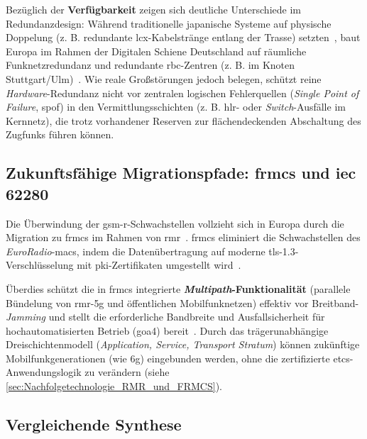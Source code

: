 \documentclass[runningheads]{res/llncs}
\begin{document}
Bezüglich der \textbf{Verfügbarkeit} zeigen sich deutliche Unterschiede im Redundanzdesign: Während traditionelle japanische Systeme auf physische Doppelung (z. B. redundante \gls{lcx}-Kabelstränge entlang der Trasse) setzten~\parencite[S. 14--15]{xiangliuCyber2020}, baut Europa im Rahmen der Digitalen Schiene Deutschland auf räumliche Funknetzredundanz und redundante \gls{rbc}-Zentren (z. B. im Knoten Stuttgart/Ulm)~\parencite[S. 89--90, 211]{trinckaufETCS2024}. Wie reale Großstörungen jedoch belegen, schützt reine \textit{Hardware}-Redundanz nicht vor zentralen logischen Fehlerquellen (\textit{Single Point of Failure}, \gls{spof}) in den Vermittlungsschichten (z. B. \gls{hlr}- oder \textit{Switch}-Ausfälle im Kernnetz), die trotz vorhandener Reserven zur flächendeckenden Abschaltung des Zugfunks führen können.

\subsection{\texorpdfstring{Zukunftsfähige Migrationspfade: \gls{frmcs} und \gls{iec} 62280}{Zukunftsfähige Migrationspfade: FRMCS und IEC 62280}}
\label{sec:Zukunftsfähige_Migrationspfade_FRMCS_und_IEC_62280}
Die Überwindung der \gls{gsm-r}-Schwachstellen vollzieht sich in Europa durch die Migration zu \gls{frmcs} im Rahmen von \gls{rmr}~\parencite[S. 49, 123]{trinckaufETCS2024}. \gls{frmcs} eliminiert die Schwachstellen des \textit{EuroRadio}-\gls{mac}s, indem die Datenübertragung auf moderne \gls{tls}-1.3-Verschlüsselung mit \gls{pki}-Zertifikaten umgestellt wird~\parencite[S. 105, 211]{trinckaufETCS2024}. 

Überdies schützt die in \gls{frmcs} integrierte \textbf{\textit{Multipath}-Funktionalität} (parallele Bündelung von \gls{rmr}-\gls{5g} und öffentlichen Mobilfunknetzen) effektiv vor Breitband-\textit{Jamming} und stellt die erforderliche Bandbreite und Ausfallsicherheit für hochautomatisierten Betrieb (\gls{goa4}) bereit~\parencite[S. 123, 211]{trinckaufETCS2024}. Durch das trägerunabhängige Dreischichtenmodell (\textit{Application, Service, Transport Stratum}) können zukünftige Mobilfunkgenerationen (wie \gls{6g}) eingebunden werden, ohne die zertifizierte \gls{etcs}-Anwendungslogik zu verändern (siehe \autoref{sec:Nachfolgetechnologie_RMR_und_FRMCS}).

\subsection{Vergleichende Synthese}
\label{sec:Vergleichende_Synthese}
\end{document}
